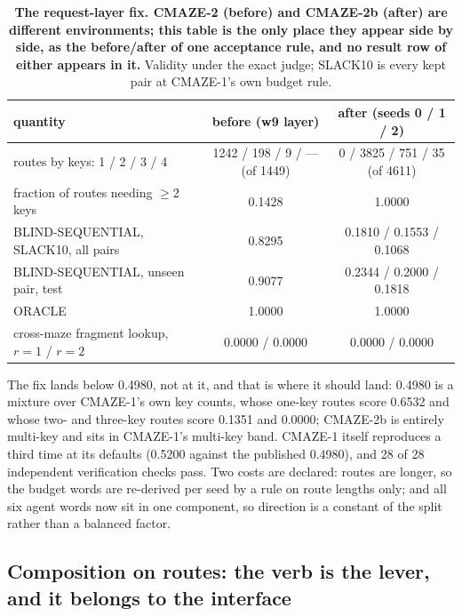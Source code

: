\documentclass{article} %
\begin{document}
\begin{table}[t]
\centering\small
\caption{\textbf{The request-layer fix. CMAZE-2 (before) and CMAZE-2b (after) are different
environments; this table is the only place they appear side by side, as the before/after of one
acceptance rule, and no result row of either appears in it.} Validity under the exact judge;
SLACK10 is every kept pair at CMAZE-1's own budget rule.}
\label{tab:req}
\setlength{\tabcolsep}{3pt}
\begin{tabular}{lcc}
\toprule
quantity & before (w9 layer) & after (seeds 0 / 1 / 2) \\
\midrule
routes by keys: 1 / 2 / 3 / 4 & 1242 / 198 / 9 / --- (of 1449) & 0 / 3825 / 751 / 35 (of 4611) \\
fraction of routes needing $\ge2$ keys & 0.1428 & 1.0000 \\
BLIND-SEQUENTIAL, SLACK10, all pairs & 0.8295 & 0.1810 / 0.1553 / 0.1068 \\
BLIND-SEQUENTIAL, unseen pair, test & 0.9077 & 0.2344 / 0.2000 / 0.1818 \\
ORACLE & 1.0000 & 1.0000 \\
cross-maze fragment lookup, $r=1$ / $r=2$ & 0.0000 / 0.0000 & 0.0000 / 0.0000 \\
\bottomrule
\end{tabular}
\end{table}

\noindent The fix lands below 0.4980, not at it, and that is where it should land: 0.4980 is a
mixture over CMAZE-1's own key counts, whose one-key routes score 0.6532 and whose two- and
three-key routes score 0.1351 and 0.0000; CMAZE-2b is entirely multi-key and sits in CMAZE-1's
multi-key band. CMAZE-1 itself reproduces a third time at its defaults (0.5200 against the
published 0.4980), and 28 of 28 independent verification checks pass.
Two costs are declared: routes are longer, so the budget words are re-derived per seed by a
rule on route lengths only; and all six agent words now sit in one component, so direction is a
constant of the split rather than a balanced factor. %

\subsection{Composition on routes: the verb is the lever, and it belongs to the interface}
\label{sec:verb}
\end{document}
